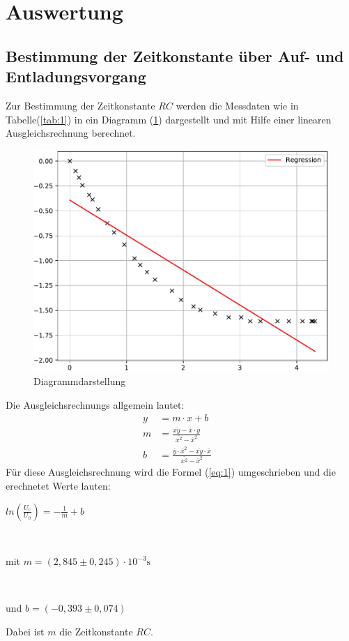 
\section{Auswertung}
\subsection{Bestimmung der Zeitkonstante über Auf- und Entladungsvorgang}
Zur Bestimmung der Zeitkonstante $RC$ werden die Messdaten wie in Tabelle(\ref{tab:1})
in ein Diagramm (\ref{fig:6}) dargestellt und mit Hilfe einer linearen Ausgleichsrechnung
berechnet.

\begin{figure}[H]
  \centering
  \includegraphics[width=\textwidth]{Diagramm1.pdf}
  \caption{Diagrammdarstellung}
  \label{fig:6}
\end{figure}
Die Ausgleichsrechnungs allgemein lautet:
\begin{align}
  y & = m \cdot x + b \label{eq:9}\\
  m & = \frac {\bar{xy} - \bar{x} \cdot \bar{y}} {\bar{x^2} -\bar{x}^2}&  \label{eq:10}\\
  b & = \frac {\bar{y} \cdot \bar{x}^2 - \bar{xy} \cdot \bar{x}} {\bar{x^2}-\bar{x}^2}& \label{eq:11}
\end{align}
Für diese Ausgleichsrechnung wird die Formel (\ref{eq:1}) umgeschrieben und die erechnetet Werte lauten: \\
\newline
\centerline{$ln(\frac{U_\text{c}}{U_\text{0}}) = -\frac{1}{m} + b$}\\
\newline
\centerline{mit $m = (2,845 \pm 0,245) \cdot 10^{-3} \si{\second}$}\\
\newline
\centerline{und $b = (-0,393 \pm 0,074)$}
\newline
Dabei ist $m$ die Zeitkonstante $RC$.
